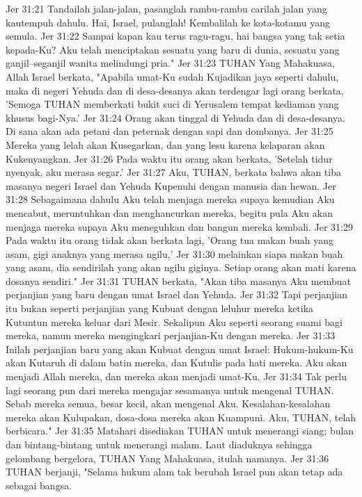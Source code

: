 Jer 31:21  Tandailah jalan-jalan, pasanglah rambu-rambu carilah jalan yang kautempuh dahulu. Hai, Israel, pulanglah! Kembalilah ke kota-kotamu yang semula.
Jer 31:22  Sampai kapan kau terus ragu-ragu, hai bangsa yang tak setia kepada-Ku? Aku telah menciptakan sesuatu yang baru di dunia, sesuatu yang ganjil--seganjil wanita melindungi pria."
Jer 31:23  TUHAN Yang Mahakuasa, Allah Israel berkata, "Apabila umat-Ku sudah Kujadikan jaya seperti dahulu, maka di negeri Yehuda dan di desa-desanya akan terdengar lagi orang berkata, 'Semoga TUHAN memberkati bukit suci di Yerusalem tempat kediaman yang khusus bagi-Nya.'
Jer 31:24  Orang akan tinggal di Yehuda dan di desa-desanya. Di sana akan ada petani dan peternak dengan sapi dan dombanya.
Jer 31:25  Mereka yang lelah akan Kusegarkan, dan yang lesu karena kelaparan akan Kukenyangkan.
Jer 31:26  Pada waktu itu orang akan berkata, 'Setelah tidur nyenyak, aku merasa segar.'
Jer 31:27  Aku, TUHAN, berkata bahwa akan tiba masanya negeri Israel dan Yehuda Kupenuhi dengan manusia dan hewan.
Jer 31:28  Sebagaimana dahulu Aku telah menjaga mereka supaya kemudian Aku mencabut, meruntuhkan dan menghancurkan mereka, begitu pula Aku akan menjaga mereka supaya Aku meneguhkan dan bangun mereka kembali.
Jer 31:29  Pada waktu itu orang tidak akan berkata lagi, 'Orang tua makan buah yang asam, gigi anaknya yang merasa ngilu,'
Jer 31:30  melainkan siapa makan buah yang asam, dia sendirilah yang akan ngilu giginya. Setiap orang akan mati karena dosanya sendiri."
Jer 31:31  TUHAN berkata, "Akan tiba masanya Aku membuat perjanjian yang baru dengan umat Israel dan Yehuda.
Jer 31:32  Tapi perjanjian itu bukan seperti perjanjian yang Kubuat dengan leluhur mereka ketika Kutuntun mereka keluar dari Mesir. Sekalipun Aku seperti seorang suami bagi mereka, namun mereka mengingkari perjanjian-Ku dengan mereka.
Jer 31:33  Inilah perjanjian baru yang akan Kubuat dengan umat Israel: Hukum-hukum-Ku akan Kutaruh di dalam batin mereka, dan Kutulis pada hati mereka. Aku akan menjadi Allah mereka, dan mereka akan menjadi umat-Ku.
Jer 31:34  Tak perlu lagi seorang pun dari mereka mengajar sesamanya untuk mengenal TUHAN. Sebab mereka semua, besar kecil, akan mengenal Aku. Kesalahan-kesalahan mereka akan Kulupakan, dosa-dosa mereka akan Kuampuni. Aku, TUHAN, telah berbicara."
Jer 31:35  Matahari disediakan TUHAN untuk menerangi siang; bulan dan bintang-bintang untuk menerangi malam. Laut diaduknya sehingga gelombang bergelora, TUHAN Yang Mahakuasa, itulah namanya.
Jer 31:36  TUHAN berjanji, "Selama hukum alam tak berubah Israel pun akan tetap ada sebagai bangsa.
